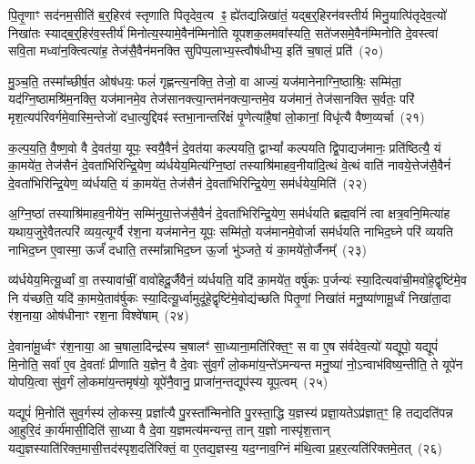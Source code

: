 पि॒तृ॒णाꣳ सद॑नम॒सीति॑ ब॒र्॒\mbox{}हिरव॑ स्तृणाति पितृदेव॒त्य ꣴ॒ ह्ये॑तद्यन्निखा॑तं॒ यद्ब॒र्॒\mbox{}हिरन॑वस्तीर्य मिनु॒यात्पि॑तृदेव॒त्यो॑ निखा॑तः स्याद्ब॒र्॒\mbox{}हिर॑व॒स्तीर्य॑ मिनोत्य॒स्यामे॒वैन॑म्मिनोति यूपशक॒लमवा᳚स्यति॒ सते॑जसमे॒वैन॑म्मिनोति दे॒वस्त्वा॑ सवि॒ता मध्वा॑न॒क्त्वित्या॑ह॒ तेज॑सै॒वैन॑मनक्ति सुपिप्प॒लाभ्य॒स्त्वौष॑धीभ्य॒ इति॑ च॒षालं॒ प्रति॑~(२०)\ip

मु॒ञ्च॒ति॒ तस्मा᳚च्छीर्\mbox{}ष॒त ओष॑धयः॒ फलं॑ गृह्णन्त्य॒नक्ति॒ तेजो॒ वा आज्यं॒ यज॑मानेनाग्नि॒ष्ठाश्रिः॒ सम्मि॑ता॒ यद॑ग्नि॒ष्ठा\-मश्रि॑म॒नक्ति॒ यज॑मानमे॒व तेज॑सानक्त्या॒न्तम॑नक्त्या॒न्तमे॒व यज॑मानं॒ तेज॑सानक्ति स॒र्वतः॒ परि॑ मृश॒त्यप॑रिवर्गमे॒वा\-स्मि॒न्तेजो॑ दधा॒त्युद्दिवꣴ॑ स्तभा॒नान्तरि॑क्षं पृ॒णेत्या॑है॒षां लो॒कानां॒ विधृ॑त्यै वैष्ण॒व्यर्चा~(२१)\ip

क॒ल्प॒य॒ति॒ वै॒ष्ण॒वो वै दे॒वत॑या॒ यूपः॒ स्वयै॒वैनं॑ दे॒वत॑या कल्पयति॒ द्वा\-भ्यां᳚ कल्पयति द्वि॒पाद्यज॑मानः॒ प्रति॑ष्ठित्यै॒ यं का॒मये॑त॒ तेज॑सैनं दे॒वता॑भिरिन्द्रि॒येण॒ व्य॑र्धयेय॒मित्य॑ग्नि॒ष्ठां तस्याश्रि॑माहव॒नीया॑दि॒त्थं वे॒त्थं वाति॑ नावये॒त्तेज॑सै॒वैनं॑ दे॒वता॑भिरिन्द्रि॒येण॒ व्य॑र्धयति॒ यं का॒मये॑त॒ तेज॑सैनं दे॒वता॑भिरिन्द्रि॒येण॒ सम॑र्धयेय॒मिति॑~(२२)\ip

अ॒ग्नि॒ष्ठां तस्याश्रि॑माहव॒नीये॑न॒ सम्मि॑नुया॒त्तेज॑सै॒वैनं॑ दे॒वता॑भिरिन्द्रि॒येण॒ सम॑र्धयति ब्रह्म॒वनिं॑ त्वा क्षत्र॒वनि॒मित्या॑ह यथाय॒जुरे॒वैतत्परि॑ व्यय॒त्यूर्ग्वै र॑श॒ना यज॑मानेन॒ यूपः॒ सम्मि॑तो॒ यज॑मानमे॒वोर्जा सम॑र्धयति नाभिद॒घ्ने परि॑ व्ययति नाभिद॒घ्न ए॒वास्मा॒ ऊर्जं॑ दधाति॒ तस्मा᳚न्नाभिद॒घ्न ऊ॒र्जा भु॑ञ्जते॒ यं का॒मये॑तो॒र्जैनम्᳚~(२३)\ip

व्य॑र्धयेय॒मित्यू॒र्ध्वां वा॒ तस्यावा॑चीं॒ वावो॑हेदू॒र्जैवैनं॒ व्य॑र्धयति॒ यदि॑ का॒मये॑त॒ वर्\mbox{}षु॑कः प॒र्जन्यः॑ स्या॒दित्यवा॑ची॒मवो॑हे॒\-द्वृष्टि॑मे॒व नि य॑च्छति॒ यदि॑ का॒मये॒ताव॑र्\mbox{}षुकः स्या॒दित्यू॒र्ध्वामुदू॑हे॒द्वृष्टि॑मे॒वोद्य॑च्छति पितृ॒णां निखा॑तं मनु॒ष्या॑णामू॒र्ध्वं निखा॑ता॒दा र॑श॒नाया॒ ओष॑धीनाꣳ रश॒ना विश्वे॑षाम्~(२४)\ip

दे॒वाना॑मू॒र्ध्वꣳ र॑श॒नाया॒ आ च॒षाला॒दिन्द्र॑स्य च॒षालꣳ॑ सा॒ध्याना॒मति॑रिक्त॒ꣳ॒ स वा ए॒ष स॑र्वदेव॒त्यो॑ यद्यूपो॒ यद्यूपं॑ मि॒नोति॒ सर्वा॑ ए॒व दे॒वताः᳚ प्रीणाति य॒ज्ञेन॒ वै दे॒वाः सु॑व॒र्गं लो॒कमा॑य॒न्ते॑\-ऽमन्यन्त मनु॒ष्या॑ नो॒\-ऽन्वाभ॑विष्य॒न्तीति॒ ते यूपे॑न योपयि॒त्वा सु॑व॒र्गं लो॒कमा॑य॒न्तमृष॑यो॒ यूपे॑नै॒वानु॒ प्राजा॑न॒न्तद्यूप॑स्य यूप॒त्वम्~(२५)\ip

यद्यूपं॑ मि॒नोति॑ सुव॒र्गस्य॑ लो॒कस्य॒ प्रज्ञा᳚त्यै पु॒रस्ता᳚न्मिनोति पु॒रस्ता॒द्धि य॒ज्ञस्य॑ प्रज्ञा॒यते\-ऽप्र॑ज्ञात॒ꣳ॒ हि तद्यदति॑पन्न आ॒हुरि॒दं का॒र्य॑मासी॒दिति॑ सा॒ध्या वै दे॒वा य॒ज्ञमत्य॑मन्यन्त॒ तान् य॒ज्ञो नास्पृ॑श॒त्तान् यद्य॒ज्ञस्याति॑रिक्त॒मासी॒त्तद॑स्पृश॒\-दति॑रिक्तं॒ वा ए॒तद्य॒ज्ञस्य॒ यद॒ग्नाव॒ग्निं म॑थि॒त्वा प्र॒हर॒त्यति॑रिक्तमे॒तत्~(२६)\ip

